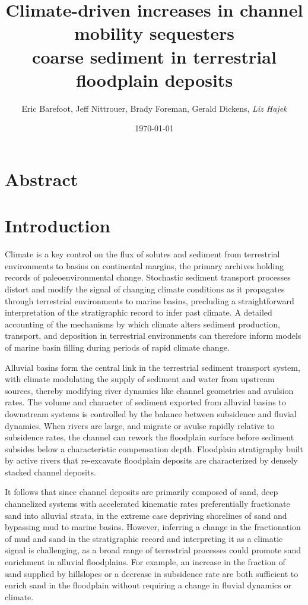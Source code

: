 \documentclass[draft]{compact_proposal}\usepackage[]{graphicx}\usepackage[]{color}
\title{Climate-driven increases in channel mobility sequesters \\ coarse sediment in terrestrial floodplain deposits}
\author{Eric Barefoot, Jeff Nittrouer, Brady Foreman, Gerald Dickens, \textit{Liz Hajek}}
\date{\today}
\begin{document}
\maketitle





\section{Abstract}

\section{Introduction}

Climate is a key control on the flux of solutes and sediment from terrestrial environments to basins on continental margins, the primary archives holding records of paleoenvironmental change.
Stochastic sediment transport processes distort and modify the signal of changing climate conditions as it propagates through terrestrial environments to marine basins, precluding a straightforward interpretation of the stratigraphic record to infer past climate.
A detailed accounting of the mechanisms by which climate alters sediment production, transport, and deposition in terrestrial environments can therefore inform models of marine basin filling during periods of rapid climate change.

Alluvial basins form the central link in the terrestrial sediment transport system, with climate modulating the supply of sediment and water from upstream sources, thereby modifying river dynamics like channel geometries and avulsion rates. 
The volume and character of sediment exported from alluvial basins to downstream systems is controlled by the balance between subsidence and fluvial dynamics.
When rivers are large, and migrate or avulse rapidly relative to subsidence rates, the channel can rework the floodplain surface before sediment subsides below a characteristic compensation depth.
Floodplain stratigraphy built by active rivers that re-excavate floodplain deposits are characterized by densely stacked channel deposits.

It follows that since channel deposits are primarily composed of sand, deep channelized systems with accelerated kinematic rates preferentially fractionate sand into alluvial strata, in the extreme case depriving shorelines of sand and bypassing mud to marine basins.
However, inferring a change in the fractionation of mud and sand in the stratigraphic record and interpreting it as a climatic signal is challenging, as a broad range of terrestrial processes could promote sand enrichment in alluvial floodplains.
For example, an increase in the fraction of sand supplied by hillslopes or a decrease in subsidence rate are both sufficient to enrich sand in the floodplain without requiring a change in fluvial dynamics or climate.
\end{document}
